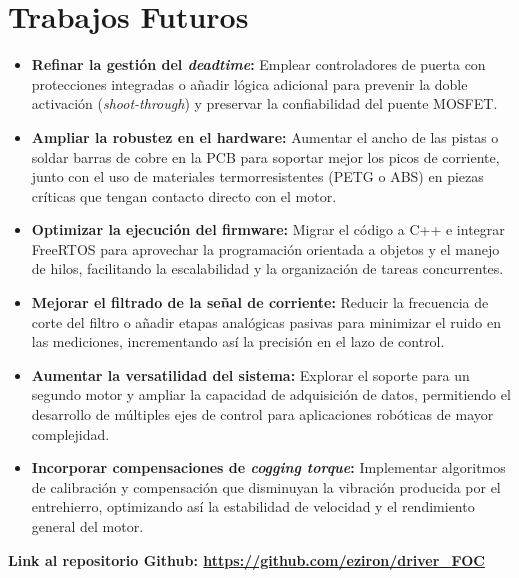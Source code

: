 \documentclass[11pt]{report}
\begin{document}
\section*{Trabajos Futuros}
\begin{itemize}
	\item \textbf{Refinar la gestión del \emph{deadtime}:} Emplear controladores de puerta con protecciones integradas o añadir lógica adicional para prevenir la doble activación (\emph{shoot-through}) y preservar la confiabilidad del puente MOSFET.

	\item \textbf{Ampliar la robustez en el hardware:} Aumentar el ancho de las pistas o soldar barras de cobre en la PCB para soportar mejor los picos de corriente, junto con el uso de materiales termorresistentes (PETG o ABS) en piezas críticas que tengan contacto directo con el motor.

	\item \textbf{Optimizar la ejecución del firmware:} Migrar el código a C++ e integrar FreeRTOS para aprovechar la programación orientada a objetos y el manejo de hilos, facilitando la escalabilidad y la organización de tareas concurrentes.

	\item \textbf{Mejorar el filtrado de la señal de corriente:} Reducir la frecuencia de corte del filtro o añadir etapas analógicas pasivas para minimizar el ruido en las mediciones, incrementando así la precisión en el lazo de control.

	\item \textbf{Aumentar la versatilidad del sistema:} Explorar el soporte para un segundo motor y ampliar la capacidad de adquisición de datos, permitiendo el desarrollo de múltiples ejes de control para aplicaciones robóticas de mayor complejidad.

	\item \textbf{Incorporar compensaciones de \emph{cogging torque}:} Implementar algoritmos de calibración y compensación que disminuyan la vibración producida por el entrehierro, optimizando así la estabilidad de velocidad y el rendimiento general del motor.
\end{itemize}

\textbf{Link al repositorio Github: \url{https://github.com/eziron/driver_FOC}}

\newpage
{}
\printbibliography

\href{https://www.youtube.com/watch?v=2yJgwwDcgV8}{\phantom{ASDF--------------------ASDF}}
\end{document}
